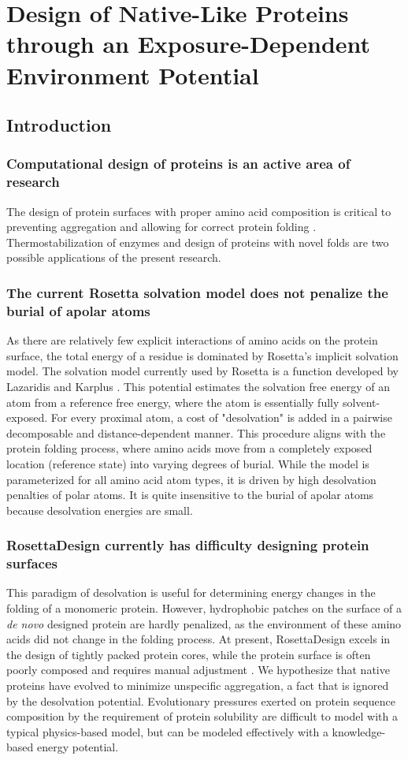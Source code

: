 \chapter{Design of Native-Like Proteins through an Exposure-Dependent Environment Potential}
\label{chap:nv_kbp}
\section{Introduction}
\subsection{Computational design of proteins is an active area of research}
The design of protein surfaces with proper amino acid composition is critical to preventing aggregation and allowing for correct protein folding \citep{Chandler:2005ds}.
Thermostabilization of enzymes and design of proteins with novel folds are two possible applications of the present research. 

\subsection{The current Rosetta solvation model does not penalize the burial of apolar atoms}
As there are relatively few explicit interactions of amino acids on the protein surface, the total energy of a residue is dominated by Rosetta's implicit solvation model.
The solvation model currently used by Rosetta is a function developed by Lazaridis and Karplus \citep{Lazaridis:1999wi}.
This potential estimates the solvation free energy of an atom from a reference free energy, where the atom is essentially fully solvent-exposed.
For every proximal atom, a cost of "desolvation" is added in a pairwise decomposable and distance-dependent manner.
This procedure aligns with the protein folding process, where amino acids move from a completely exposed location (reference state) into varying degrees of burial.
While the model is parameterized for all amino acid atom types, it is driven by high desolvation penalties of polar atoms.
It is quite insensitive to the burial of apolar atoms because desolvation energies are small. 

\subsection{RosettaDesign currently has difficulty designing protein surfaces}
This paradigm of desolvation is useful for determining energy changes in the folding of a monomeric protein.
However, hydrophobic patches on the surface of a \textit{de novo} designed protein are hardly penalized, as the environment of these amino acids did not change in the folding process.
At present, RosettaDesign excels in the design of tightly packed protein cores, while the protein surface is often poorly composed and requires manual adjustment \citep{Dantas:2003vt}.
We hypothesize that native proteins have evolved to minimize unspecific aggregation, a fact that is ignored by the desolvation potential.
Evolutionary pressures exerted on protein sequence composition by the requirement of protein solubility are difficult to model with a typical physics-based model, but can be modeled effectively with a knowledge-based energy potential. 


